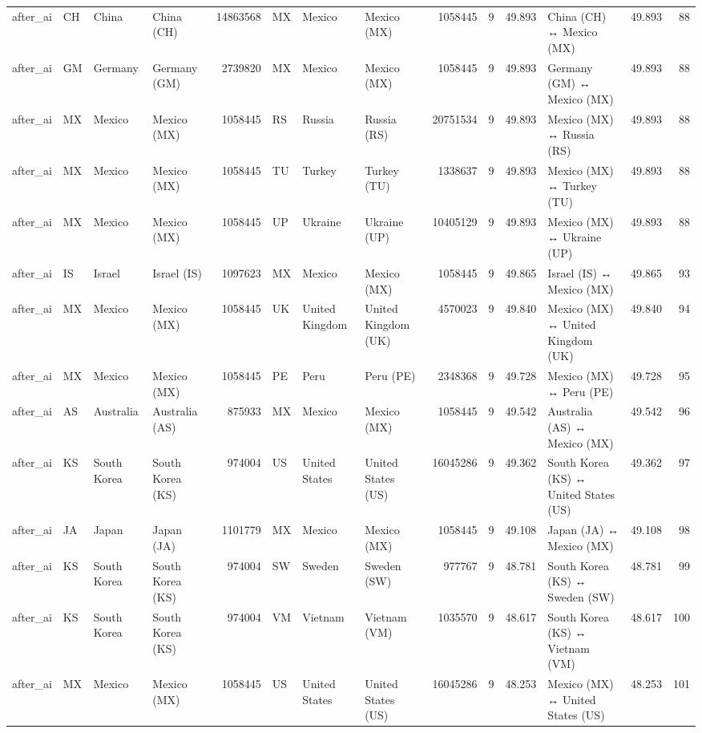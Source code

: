 \begin{tabular}{llllrlllrrrlrr}
after\_ai & CH & China & China (CH) & 14863568 & MX & Mexico & Mexico (MX) & 1058445 & 9 & 49.893 & China (CH) ↔ Mexico (MX) & 49.893 & 88 \\
after\_ai & GM & Germany & Germany (GM) & 2739820 & MX & Mexico & Mexico (MX) & 1058445 & 9 & 49.893 & Germany (GM) ↔ Mexico (MX) & 49.893 & 88 \\
after\_ai & MX & Mexico & Mexico (MX) & 1058445 & RS & Russia & Russia (RS) & 20751534 & 9 & 49.893 & Mexico (MX) ↔ Russia (RS) & 49.893 & 88 \\
after\_ai & MX & Mexico & Mexico (MX) & 1058445 & TU & Turkey & Turkey (TU) & 1338637 & 9 & 49.893 & Mexico (MX) ↔ Turkey (TU) & 49.893 & 88 \\
after\_ai & MX & Mexico & Mexico (MX) & 1058445 & UP & Ukraine & Ukraine (UP) & 10405129 & 9 & 49.893 & Mexico (MX) ↔ Ukraine (UP) & 49.893 & 88 \\
after\_ai & IS & Israel & Israel (IS) & 1097623 & MX & Mexico & Mexico (MX) & 1058445 & 9 & 49.865 & Israel (IS) ↔ Mexico (MX) & 49.865 & 93 \\
after\_ai & MX & Mexico & Mexico (MX) & 1058445 & UK & United Kingdom & United Kingdom (UK) & 4570023 & 9 & 49.840 & Mexico (MX) ↔ United Kingdom (UK) & 49.840 & 94 \\
after\_ai & MX & Mexico & Mexico (MX) & 1058445 & PE & Peru & Peru (PE) & 2348368 & 9 & 49.728 & Mexico (MX) ↔ Peru (PE) & 49.728 & 95 \\
after\_ai & AS & Australia & Australia (AS) & 875933 & MX & Mexico & Mexico (MX) & 1058445 & 9 & 49.542 & Australia (AS) ↔ Mexico (MX) & 49.542 & 96 \\
after\_ai & KS & South Korea & South Korea (KS) & 974004 & US & United States & United States (US) & 16045286 & 9 & 49.362 & South Korea (KS) ↔ United States (US) & 49.362 & 97 \\
after\_ai & JA & Japan & Japan (JA) & 1101779 & MX & Mexico & Mexico (MX) & 1058445 & 9 & 49.108 & Japan (JA) ↔ Mexico (MX) & 49.108 & 98 \\
after\_ai & KS & South Korea & South Korea (KS) & 974004 & SW & Sweden & Sweden (SW) & 977767 & 9 & 48.781 & South Korea (KS) ↔ Sweden (SW) & 48.781 & 99 \\
after\_ai & KS & South Korea & South Korea (KS) & 974004 & VM & Vietnam & Vietnam (VM) & 1035570 & 9 & 48.617 & South Korea (KS) ↔ Vietnam (VM) & 48.617 & 100 \\
after\_ai & MX & Mexico & Mexico (MX) & 1058445 & US & United States & United States (US) & 16045286 & 9 & 48.253 & Mexico (MX) ↔ United States (US) & 48.253 & 101 \\

\end{tabular}
